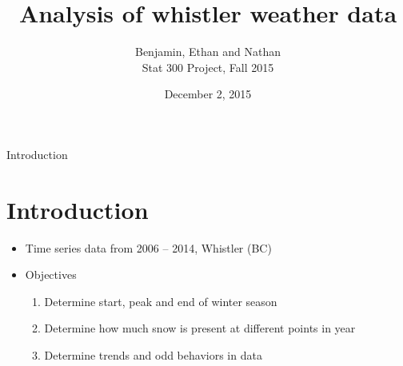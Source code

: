 \documentclass{beamer}
\begin{document}
\title{Analysis of whistler weather data}
\author{Benjamin, Ethan and Nathan \\ \vspace{1mm}
Stat 300 Project, Fall 2015}
\date{December 2, 2015}

\begin{frame}
\titlepage
\end{frame}

\begin{frame}{Introduction}

\section{Introduction}

\begin{itemize}
\item Time series data from 2006 -- 2014, Whistler (BC)
\item Objectives

\begin{enumerate}
\item Determine start, peak and end of winter season
\item Determine how much snow is present at different points in year
\item Determine trends and odd behaviors in data
\end{enumerate}

\end{itemize}

\end{frame}
\end{document}
